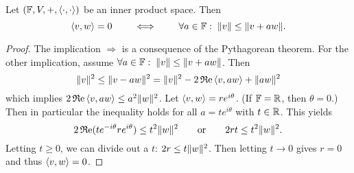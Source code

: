 \begin{lemma} \label{lemma:orthogonality}
Let $(\mathbb{F}, V,+,\left\langle \cdot,\cdot \right\rangle)$ be an inner product space. Then
\[ \left\langle v,w \right\rangle=0 \qquad \iff \qquad \forall a\in\mathbb{F}:\;\lVert v\rVert\leq\lVert v+aw\rVert.  \]
\end{lemma}
\begin{proof}
The implication $\Rightarrow$ is a consequence of the Pythagorean theorem. For the other implication, assume $\forall a\in\mathbb{F}:\;\lVert v\rVert\leq\lVert v+aw\rVert$. Then
\[ \lVert v\rVert^2 \leq \lVert v-aw\rVert^2 = \lVert v\rVert^2 - 2\operatorname{\mathfrak{R}e}\left\langle v,aw \right\rangle + \lVert aw\rVert^2 \]
which implies $2\operatorname{\mathfrak{R}e}\left\langle v,aw \right\rangle \leq a^2\lVert w\rVert^2$. Let $\left\langle v,w \right\rangle = re^{i\theta}$. (If $\mathbb{F} = \mathbb{R}$, then $\theta=0$.) Then in particular the inequality holds for all $a=te^{i\theta}$ with $t\in\mathbb{R}$. This yields
\[ 2\operatorname{\mathfrak{R}e}(te^{-i\theta}re^{i\theta}) \leq t^2\lVert w\rVert^2 \qquad \text{or}\qquad 2rt\leq t^2\lVert w\rVert^2. \]
Letting $t\geq 0$, we can divide out a $t$: $2r\leq t\lVert w\rVert^2$. Then letting $t\to 0$ gives $r=0$ and thus $\left\langle v,w \right\rangle=0$.
\end{proof}

